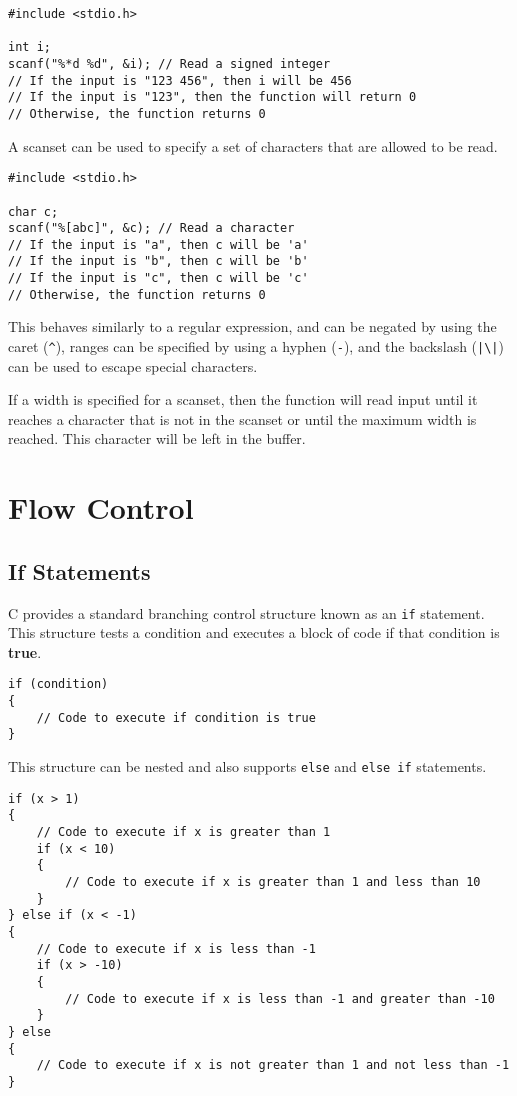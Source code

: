 \documentclass{report}
\begin{document}
\begin{verbatim}
#include <stdio.h>

int i;
scanf("%*d %d", &i); // Read a signed integer
// If the input is "123 456", then i will be 456
// If the input is "123", then the function will return 0
// Otherwise, the function returns 0
\end{verbatim}
A scanset can be used to specify a set of characters that are allowed
to be read.
\begin{verbatim}
#include <stdio.h>

char c;
scanf("%[abc]", &c); // Read a character
// If the input is "a", then c will be 'a'
// If the input is "b", then c will be 'b'
// If the input is "c", then c will be 'c'
// Otherwise, the function returns 0
\end{verbatim}
This behaves similarly to a regular expression, and can be negated by
using the caret (\texttt{^}), ranges can be specified by using a
hyphen (\texttt{-}), and the backslash
(\texttt{|\backslash|}) can be used to escape
special characters.

If a width is specified for a scanset, then the function will read
input until it reaches a character that is not in the scanset or until
the maximum width is reached. This character will be left in the
buffer.
\chapter{Flow Control}
\section{If Statements}
C provides a standard branching control structure known as an
\texttt{if} statement. This structure tests a condition and
executes a block of code if that condition is \textbf{true}.
\begin{verbatim}
if (condition)
{
    // Code to execute if condition is true
}
\end{verbatim}
This structure can be nested and also supports \texttt{else} and
\texttt{else if} statements.
\begin{verbatim}
if (x > 1)
{
    // Code to execute if x is greater than 1
    if (x < 10)
    {
        // Code to execute if x is greater than 1 and less than 10
    }
} else if (x < -1)
{
    // Code to execute if x is less than -1
    if (x > -10)
    {
        // Code to execute if x is less than -1 and greater than -10
    }
} else
{
    // Code to execute if x is not greater than 1 and not less than -1
}
\end{verbatim}
\end{document}
